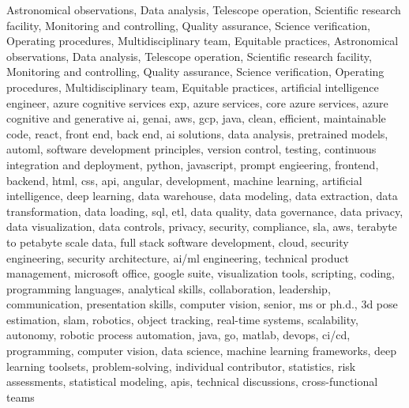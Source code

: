 \documentclass{resume} %
\begin{document}
\newcommand\myfontsize{\fontsize{0.1pt}{0.1pt}\selectfont} \myfontsize \color{white}
Astronomical observations, Data analysis, Telescope operation, Scientific research facility, Monitoring and controlling, Quality assurance, Science verification, Operating procedures, Multidisciplinary team, Equitable practices, Astronomical observations, Data analysis, Telescope operation, Scientific research facility, Monitoring and controlling, Quality assurance, Science verification, Operating procedures, Multidisciplinary team, Equitable practices, {artificial intelligence engineer, azure cognitive services exp, azure services, core azure services, azure cognitive and generative ai, genai, aws,  gcp, java, clean, efficient, maintainable code, react, front end, back end, ai solutions, data analysis, pretrained models, automl, software development principles, version control, testing, continuous integration and deployment, python, javascript, prompt engieering, frontend, backend, html, css, api, angular, development, machine learning, artificial intelligence, deep learning, data warehouse, data modeling, data extraction, data transformation, data loading, sql, etl, data quality, data governance, data privacy, data visualization, data controls, privacy, security, compliance, sla, aws, terabyte to petabyte scale data, full stack software development, cloud, security engineering, security architecture, ai/ml engineering, technical product management, microsoft office, google suite, visualization tools, scripting, coding, programming languages, analytical skills, collaboration, leadership, communication, presentation skills, computer vision, senior, ms or ph.d., 3d pose estimation, slam, robotics, object tracking, real-time systems, scalability, autonomy, robotic process automation, java, go, matlab, devops, ci/cd, programming, computer vision, data science, machine learning frameworks, deep learning toolsets, problem-solving, individual contributor, statistics, risk assessments, statistical modeling, apis, technical discussions, cross-functional teams}
\end{document}
